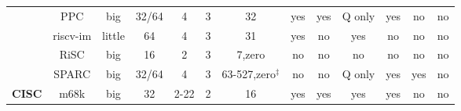 \begin{sidewaystable}[tbp]
\begin{sf}
\begin{footnotesize}
\begin{center}
\begin{tabular}{|c|c||c|c|c|c|c|c|c|c|c|c|c|}
                 & %
PPC              & %
big              & %
32/64            & %
4                & %
3                & %
32               & %
yes              & %
yes              & %
Q only           & %
yes              & %
no               & %
no                 %
\\
\cline{2-13}

		 & %
riscv-im         & %
little           & %
64               & %
4                & %
3                & %
31               & %
yes              & %
no               & %
yes              & %
no               & %
no               & %
no                 %
\\
\cline{2-13}

                 & %
RiSC             & %
big              & %
16               & %
2                & %
3                & %
7,zero           & %
no               & %
no               & %
no               & %
no               & %
no               & %
no                 %
\\
\cline{2-13}

                 & %
SPARC            & %
big              & %
32/64            & %
4                & %
3                & %
63-527,zero$^{\ddagger}$ & %
no               & %
no               & %
Q only           & %
yes              & %
yes              & %
no                 %
\\

\hline\hline


\multirow{5}{*}{\bf CISC} &
m68k             & %
big              & %
32               & %
2-22             & %
2                & %
16               & %
yes              & %
yes              & %
yes              & %
yes              & %
no               & %
no                 %
\\
\cline{2-13}


\end{tabular}
\end{center}
\end{footnotesize}
\end{sf}
\end{sidewaystable}
